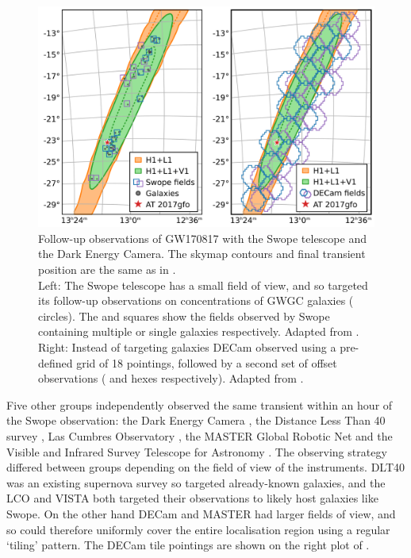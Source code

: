 \begin{colsection}
\begin{colsection}
\begin{figure}[p]
    \begin{center}
        \includegraphics[width=\linewidth]{images/170817_obs.pdf}
    \end{center}
    \caption[Follow-up observations of GW170817 with Swope and DECam]{
        Follow-up observations of GW170817 with the Swope telescope and the Dark Energy Camera. The skymap contours and final transient position are the same as in . \\
        Left: The Swope telescope has a small field of view, and so targeted its follow-up observations on concentrations of GWGC galaxies ( circles). The  and  squares show the fields observed by Swope containing multiple or single galaxies respectively. Adapted from \citet{GW170817_Swope}.\\
        Right: Instead of targeting galaxies DECam observed using a pre-defined grid of 18 pointings, followed by a second set of offset observations ( and  hexes respectively). Adapted from \citet{GW170817_DECam}.
        }\label{fig:swope_decam}
\end{figure}

Five other groups independently observed the same transient within an hour of the Swope observation: the Dark Energy Camera \citep[DECam,][]{GW170817_DECam}, the Distance Less Than \SI{40}{\mega\parsec} survey \citep[DLT40,][]{GW170817_DLT40}, Las Cumbres Observatory \citep[LCO,][]{GW170817_LCO}, the MASTER Global Robotic Net \citep{GW170817_MASTER} and the  Visible and Infrared Survey Telescope for Astronomy \citep[VISTA,][]{GW170817_VISTA}. The observing strategy differed between groups depending on the field of view of the instruments. DLT40 was an existing supernova survey so targeted already-known galaxies, and the LCO and VISTA both targeted their observations to likely host galaxies like Swope. On the other hand DECam and MASTER had larger fields of view, and so could therefore uniformly cover the entire localisation region using a regular `tiling' pattern. The DECam tile pointings are shown on the right plot of .


\end{colsection}
\end{colsection}
